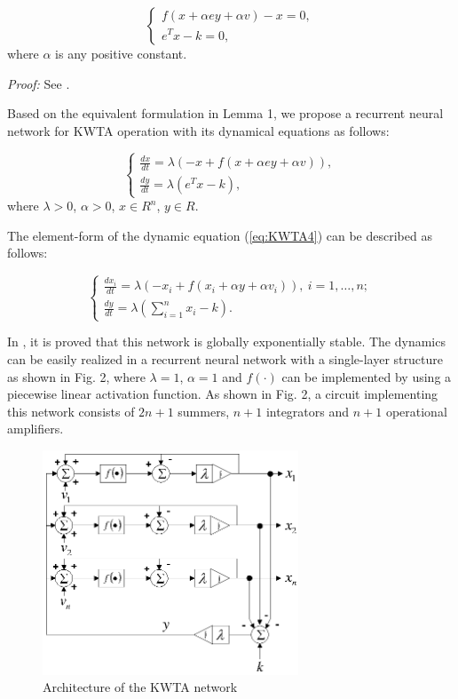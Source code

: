 \documentclass[conference]{IEEEtran}
\begin{document}
\begin{equation}
\left\{\begin{array}{c} f (x+\alpha ey+\alpha v)-x=0,\\
e^{T}x-k=0,
\end{array} \right.
\end{equation}
where $\alpha$ is any positive constant.

\textit{Proof:} See \cite[pp. 267, Prop. 5.1]{cit:28}.

Based on the equivalent formulation in Lemma 1, we propose a
recurrent neural network for KWTA operation with its dynamical
equations as follows:

\begin{equation}
\left\{\begin{array}{l} \frac{dx}{dt}=\lambda \left( -x+f (x+\alpha ey+\alpha v)\right),\\
\frac{dy}{dt}=\lambda (e^{T}x-k),
\end{array} \right.
\label{eq:KWTA4}
\end{equation}
where $\lambda >0$, $\alpha >0$, $x\in R^{n}$, $y\in R$.

The element-form of the dynamic equation (\ref{eq:KWTA4}) can be
described as follows:

\begin{equation}
\left\{\begin{array}{l} \frac{dx_i}{dt}=\lambda \left( -x_i+f (x_i+\alpha y+\alpha v_i)\right),\ i=1,\ldots,n;\\
\frac{dy}{dt}=\lambda (\sum_{i=1}^{n}x_i-k).
\end{array} \right.
\end{equation}


In \cite{cit:27}, it is proved that this network is globally
exponentially stable. The dynamics can be easily realized in a
recurrent neural network with a single-layer structure as shown in
Fig. 2, where $\lambda =1$, $\alpha =1$ and $f(\cdot)$ can be
implemented by using a piecewise linear activation function. As
shown in Fig. 2, a circuit implementing this network consists of
$2n+1$ summers, $n+1$ integrators and $n+1$ operational amplifiers.

\begin{figure}[htp]
\centerline{\includegraphics[width=3.0in]{Archi.eps}}
\caption{Architecture of the KWTA network} \label{fig 2}
\end{figure}
\end{document}
